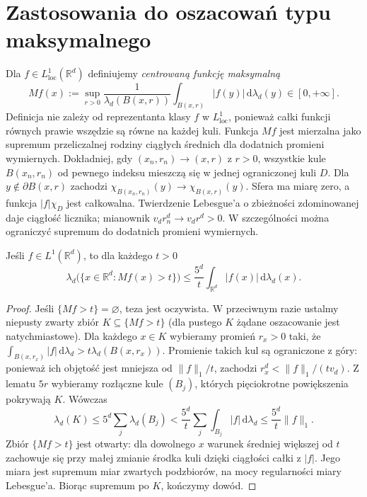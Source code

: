 \section{Zastosowania do oszacowań typu maksymalnego}
\begin{definicja}
\label{def:HL-max-24}
Dla $f\in L^1_{\mathrm{loc}}(\mathbb R^d)$ definiujemy
\emph{centrowaną funkcję maksymalną}
\[
 Mf(x):=\sup_{r>0}\frac1{\lambda_d(B(x,r))}
 \int_{B(x,r)}|f(y)|\,\mathrm d\lambda_d(y)
 \in[0,+\infty].
\]
Definicja nie zależy od reprezentanta klasy $f$ w
$L^1_{\mathrm{loc}}$, ponieważ całki funkcji równych
prawie wszędzie są równe na każdej kuli.
Funkcja $Mf$ jest mierzalna jako supremum przeliczalnej
rodziny ciągłych średnich dla dodatnich promieni wymiernych. Dokładniej, gdy $(x_n,r_n)\to(x,r)$ z $r>0$,
wszystkie kule $B(x_n,r_n)$ od pewnego indeksu
mieszczą się w jednej ograniczonej kuli $D$.
Dla $y\notin\partial B(x,r)$ zachodzi
$\chi_{B(x_n,r_n)}(y)\to\chi_{B(x,r)}(y)$.
Sfera ma miarę zero, a funkcja $|f|\chi_D$
jest całkowalna. Twierdzenie Lebesgue'a o zbieżności
zdominowanej daje ciągłość licznika; mianownik
$v_dr_n^d\to v_dr^d>0$. W szczególności można
ograniczyć supremum do dodatnich promieni wymiernych.
\end{definicja}

\begin{twierdzenie}
\label{thm:HL-weak-24}
Jeśli $f\in L^1(\mathbb R^d)$, to dla każdego $t>0$
\[
 \lambda_d\bigl(\{x\in\mathbb R^d:Mf(x)>t\}\bigr)
 \le\frac{5^d}{t}\int_{\mathbb R^d}|f(x)|\,
 \mathrm d\lambda_d(x).
\]
\end{twierdzenie}
\begin{proof}
Jeśli $\{Mf>t\}=\varnothing$, teza jest oczywista.
W przeciwnym razie ustalmy niepusty zwarty zbiór
$K\subseteq\{Mf>t\}$ (dla pustego $K$ żądane
oszacowanie jest natychmiastowe).
Dla każdego $x\in K$ wybieramy promień $r_x>0$ taki,
że $\int_{B(x,r_x)}|f|\,\mathrm d\lambda_d>
 t\lambda_d(B(x,r_x))$. Promienie takich kul są
ograniczone z góry: ponieważ ich objętość jest mniejsza
od $\|f\|_1/t$, zachodzi $r_x^d<\|f\|_1/(tv_d)$.
Z lematu $5r$ wybieramy rozłączne kule $(B_j)$, których
pięciokrotne powiększenia pokrywają $K$. Wówczas
\[
 \lambda_d(K)\le5^d\sum_j\lambda_d(B_j)
 <\frac{5^d}{t}\sum_j\int_{B_j}|f|\,\mathrm d\lambda_d
 \le\frac{5^d}{t}\|f\|_1.
\]
Zbiór $\{Mf>t\}$ jest otwarty: dla dowolnego $x$
warunek średniej większej od $t$ zachowuje się przy małej
zmianie środka kuli dzięki ciągłości całki z $|f|$.
Jego miara jest supremum miar zwartych podzbiorów,
na mocy regularności miary Lebesgue'a. Biorąc supremum
po $K$, kończymy dowód.
\end{proof}

